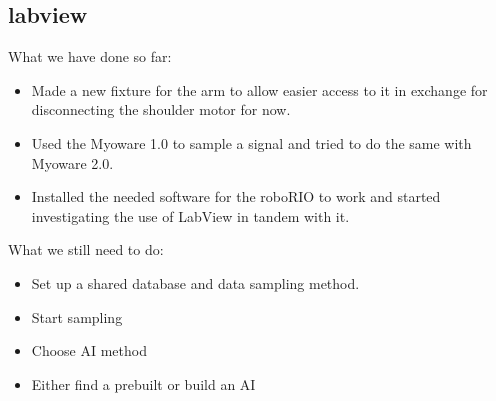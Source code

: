 \subsection{labview}

What we have done so far: 

\begin{itemize}
    
    \item Made a new fixture for the arm to allow easier access to it in exchange for disconnecting the shoulder motor for now.
    
    \item Used the Myoware 1.0 to sample a signal and tried to do the same with Myoware 2.0.
    
    \item Installed the needed software for the roboRIO to work and started investigating the use of LabView in tandem with it.
    
\end{itemize}
What we still need to do:
\begin{itemize}    
    \item Set up a shared database and data sampling method.
    
    \item Start sampling
    
    \item Choose AI method
    
    \item Either find a prebuilt or build an AI
\end{itemize}